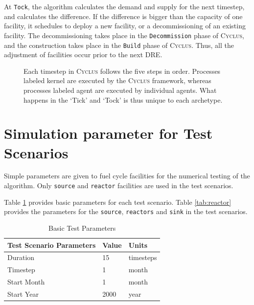 \documentclass[11pt,letterpaper]{article}
\newcommand{\Cyclus}{\textsc{Cyclus}\xspace}%
\begin{document}
At \texttt{Tock}, the algorithm calculates the demand and supply for the next timestep, and calculates
the difference. If the difference is bigger than the capacity of one facility, it
schedules to deploy a new facility, or a decommissioning of an existing facility.
The decommissioning takes place in the \texttt{Decommission} phase of \Cyclus, and
the construction takes place in the \texttt{Build} phase of \Cyclus. Thus, all the
adjustment of facilities occur prior to the next \gls{DRE}.


\begin{figure}[H]
\centering
{}
\caption{Each timestep in \Cyclus follows the five steps in order. Processes labeled
         kernel are executed by the \Cyclus framework, whereas processes labeled agent
         are executed by individual agents. What happens in the `Tick' and `Tock' is
         thus unique to each archetype.}
\label{diag:time}
\end{figure}


\section{Simulation parameter for Test Scenarios}
Simple parameters are given to fuel cycle facilities for the numerical testing of 
the algorithm.  Only \texttt{source} and \texttt{reactor} facilities are used in the test scenarios. 

Table \ref{tab:testscenario} provides basic parameters for each test scenario. 
Table \ref{tab:reactor} provides the parameters for the \texttt{source},
\texttt{reactors} and \texttt{sink} in the test scenarios.

\begin{table}[H]
	\centering
	\caption {Basic Test Parameters}
	\label{tab:testscenario}
	\begin{tabular}{|l|l|l|}
		\hline
		\textbf{Test Scenario Parameters} & \textbf{Value} & \textbf{Units} \\
		\hline
		Duration & 15 & timesteps \\
		Timestep & 1 & month \\
		Start Month & 1 & month \\
		Start Year & 2000 & year \\
		\hline
	\end{tabular}
\end{table}
\end{document}
